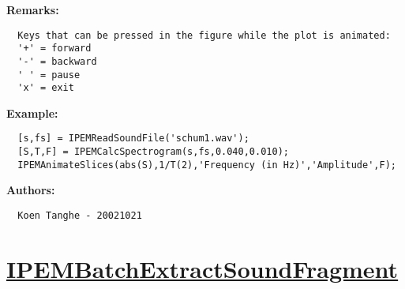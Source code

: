 \textbf{Remarks:}
\begin{verbatim}  Keys that can be pressed in the figure while the plot is animated:
  '+' = forward
  '-' = backward
  ' ' = pause
  'x' = exit

\end{verbatim}
\textbf{Example:}
\begin{verbatim}  [s,fs] = IPEMReadSoundFile('schum1.wav');
  [S,T,F] = IPEMCalcSpectrogram(s,fs,0.040,0.010);
  IPEMAnimateSlices(abs(S),1/T(2),'Frequency (in Hz)','Amplitude',F);

\end{verbatim}
\textbf{Authors:}
\begin{verbatim}  Koen Tanghe - 20021021
\end{verbatim}


\newpage
\section*{\hyperlink{Concepts:IPEMBatchExtractSoundFragment}{IPEMBatchExtractSoundFragment}}
\hypertarget{FuncRef:IPEMBatchExtractSoundFragment}{}

